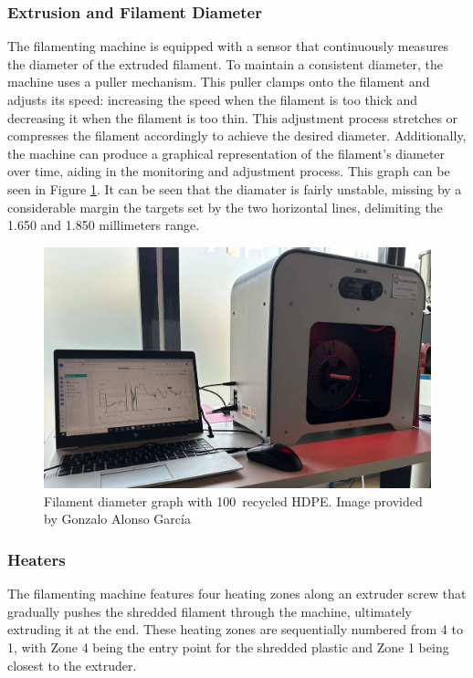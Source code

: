 \subsubsection*{Extrusion and Filament Diameter}
The filamenting machine is equipped with a sensor that continuously measures the diameter of the 
extruded filament. To maintain a consistent diameter, the machine uses a puller mechanism. This 
puller clamps onto the filament and adjusts its speed: increasing the speed when the filament is 
too thick and decreasing it when the filament is too thin. This adjustment process stretches or 
compresses the filament accordingly to achieve the desired diameter. Additionally, the machine can 
produce a graphical representation of the filament's diameter over time, aiding in the monitoring 
and adjustment process. This graph can be seen in Figure \ref{fig:filament_graph_2}. It can be 
seen that the diamater is fairly unstable, missing by a considerable margin the targets set by the 
two horizontal lines, delimiting the 1.650 and 1.850 millimeters range.

\begin{figure}[h]
	\centering
	\includegraphics[width = .85\textwidth]{Imagenes/Vectorial/filament_graph_2.pdf}
	\caption{Filament diameter graph with 100\percentsign\ recycled HDPE. Image provided by 
    Gonzalo Alonso García}
	\label{fig:filament_graph_2}
\end{figure}


\subsubsection*{Heaters}
The filamenting machine features four heating zones along an extruder screw that gradually pushes 
the shredded filament through the machine, ultimately extruding it at the end. These heating zones 
are sequentially numbered from 4 to 1, with Zone 4 being the entry point for the shredded plastic 
and Zone 1 being closest to the extruder.

